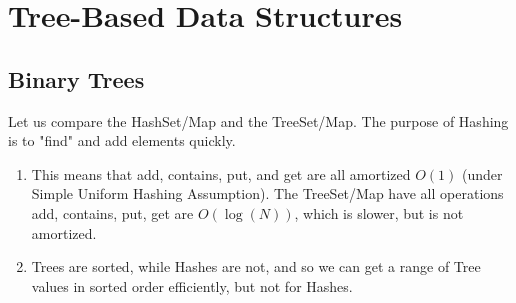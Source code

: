 \section{Tree-Based Data Structures} 

\subsection{Binary Trees} 

  Let us compare the HashSet/Map and the TreeSet/Map. The purpose of Hashing is to "find" and add elements quickly. 
  \begin{enumerate}
    \item This means that add, contains, put, and get are all amortized $O(1)$ (under Simple Uniform Hashing Assumption). The TreeSet/Map have all operations add, contains, put, get are $O(\log(N))$, which is slower, but is not amortized. 
    \item Trees are sorted, while Hashes are not, and so we can get a range of Tree values in sorted order efficiently, but not for Hashes. 
  \end{enumerate}

